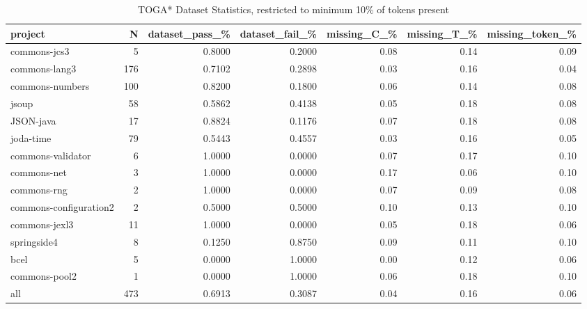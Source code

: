 \begin{table*}
\centering
\caption{TOGA* Dataset Statistics, restricted to minimum 10\% of tokens present}
\label{tab:toga_stats_10}
\begin{tabular}{lrrrrrr}
\toprule
                project &    N &  dataset\_pass\_\% &  dataset\_fail\_\% &  missing\_C\_\% &  missing\_T\_\% &  missing\_token\_\% \\
\midrule
           commons-jcs3 &    5 &          0.8000 &          0.2000 &         0.08 &         0.14 &             0.09 \\
          commons-lang3 &  176 &          0.7102 &          0.2898 &         0.03 &         0.16 &             0.04 \\
        commons-numbers &  100 &          0.8200 &          0.1800 &         0.06 &         0.14 &             0.08 \\
                  jsoup &   58 &          0.5862 &          0.4138 &         0.05 &         0.18 &             0.08 \\
              JSON-java &   17 &          0.8824 &          0.1176 &         0.07 &         0.18 &             0.08 \\
              joda-time &   79 &          0.5443 &          0.4557 &         0.03 &         0.16 &             0.05 \\
      commons-validator &    6 &          1.0000 &          0.0000 &         0.07 &         0.17 &             0.10 \\
            commons-net &    3 &          1.0000 &          0.0000 &         0.17 &         0.06 &             0.10 \\
            commons-rng &    2 &          1.0000 &          0.0000 &         0.07 &         0.09 &             0.08 \\
 commons-configuration2 &    2 &          0.5000 &          0.5000 &         0.10 &         0.13 &             0.10 \\
          commons-jexl3 &   11 &          1.0000 &          0.0000 &         0.05 &         0.18 &             0.06 \\
            springside4 &    8 &          0.1250 &          0.8750 &         0.09 &         0.11 &             0.10 \\
                   bcel &    5 &          0.0000 &          1.0000 &         0.00 &         0.12 &             0.06 \\
          commons-pool2 &    1 &          0.0000 &          1.0000 &         0.06 &         0.18 &             0.10 \\
                    all &  473 &          0.6913 &          0.3087 &         0.04 &         0.16 &             0.06 \\
\bottomrule
\end{tabular}
\end{table*}

